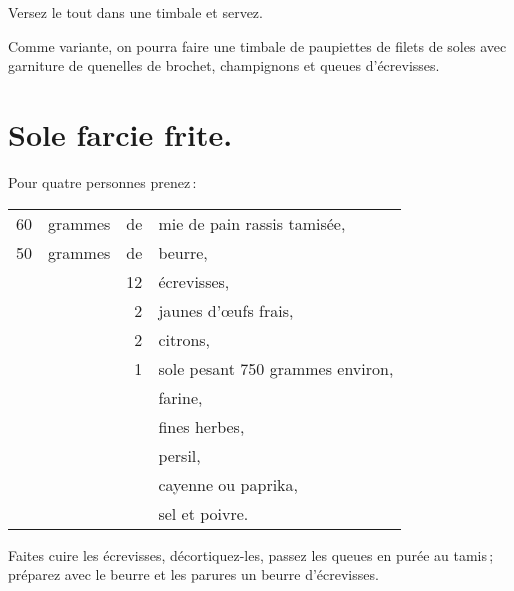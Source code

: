 Versez le tout dans une timbale et servez.

\sk

Comme variante, on pourra faire une timbale de paupiettes de filets de soles
avec garniture de quenelles de brochet, champignons et queues d'écrevisses.

\section*{\centering Sole farcie frite.}

Pour quatre personnes prenez :

\medskip

\footnotesize
\begin{longtable}{rrrp{16em}}
     60 & grammes & de & mie de pain rassis tamisée,                                                      \\
     50 & grammes & de & beurre,                                                                          \\
        &         & 12 & écrevisses,                                                                      \\
        &         &  2 & jaunes d'œufs frais,                                                             \\
        &         &  2 & citrons,                                                                         \\
        &         &  1 & sole pesant 750 grammes environ,                                                 \\
        &         &    & farine,                                                                          \\
        &         &    & fines herbes,                                                                    \\
        &         &    & persil,                                                                          \\
        &         &    & cayenne ou paprika,                                                              \\
        &         &    & sel et poivre.                                                                   \\
\end{longtable}
\normalsize

Faites cuire les écrevisses, décortiquez-les, passez les queues en purée au
tamis ; préparez avec le beurre et les parures un beurre d'écrevisses.

